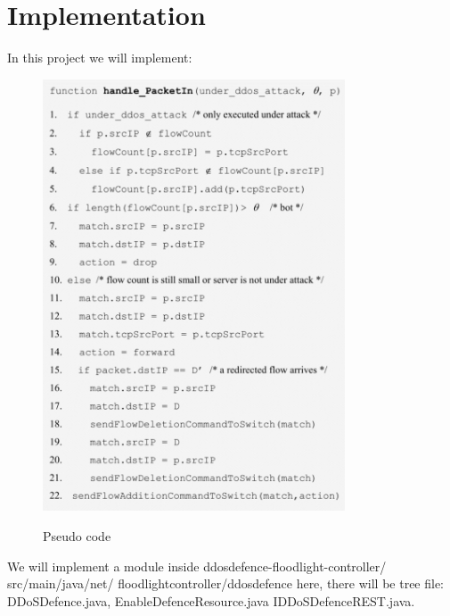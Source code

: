 \section{Implementation}
In this project we will implement:
\begin{figure}[H]
\begin{center}
\includegraphics[width=0.8\textwidth]{images/PseudoCode.png}
\label{fig:pseudocode}
\caption{Pseudo code}
\end{center}
\end{figure}

We will implement a module inside ddosdefence-floodlight-controller/ src/main/java/net/ floodlightcontroller/ddosdefence here, there will be tree file: DDoSDefence.java, EnableDefenceResource.java IDDoSDefenceREST.java.

